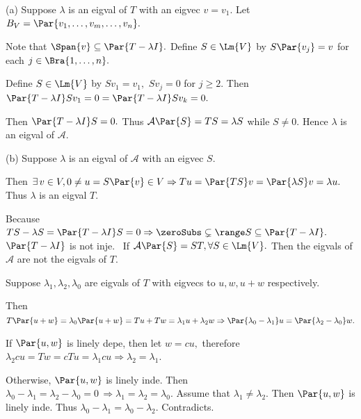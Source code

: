 \par\quad
(a) Suppose $\lambda$ is an eigval of $T$ with an eigvec $v=v_1.$ Let $B_V=\Par{v_1,\dots,v_m,\dots,v_n}.$\par\quad\Ha
Note that $\Span{v}\subseteq\null\Par{T-\lambda I}.$ Define $S\in\Lm{V}$ by $S\Par{v_j}=v$ for each $j\in\Bra{1,\dots,n}.$\par\quad\Ha
\Or Define $S\in\Lm{V}$ by $Sv_1=v_1,\,\,Sv_j=0$ for $j\geqslant 2.$ Then $\Par{T-\lambda I}Sv_1=0=\Par{T-\lambda I}Sv_k=0.$\par\quad\Ha
Then $\Par{T-\lambda I}S=0.$ Thus $\mathcal{A}\Par{S}=TS=\lambda S$ while $S\neq 0.$ Hence $\lambda$ is an eigval of $\mathcal{A}.$\vspace{4pt}\par\quad
(b) Suppose $\lambda$ is an eigval of $\mathcal{A}$ with an eigvec $S.$\par\quad\Hb
Then $\exists\,v\in V,0\neq u=S\Par{v}\in V\Rightarrow Tu=\Par{TS} v=\Par{\lambda S} v=\lambda u.$ Thus $\lambda$ is an eigval $T.$\par\quad\Hb
\Or Because $TS-\lambda S=\Par{T-\lambda I}S=0\Rightarrow\zeroSubs\subsetneq\range S\subseteq\null\Par{T-\lambda I}.$ $\Par{T-\lambda I}$ is not inje.\PfEnd\vspace{4pt}
\Comment \,\,\,{If $\mathcal{A}\Par{S}=ST,\forall S\in\Lm{V}.$ Then the eigvals of $\mathcal{A}$ are not the eigvals of $T.$}
\SepLine

Suppose $\lambda_1,\lambda_2,\lambda_0$ are eigvals of $T$ with eigvecs to $u,w,u+w$ respectively.\par
\Blind{\Solution} Then $T\Par{u+w}=\lambda_0\Par{u+w}=Tu+Tw=\lambda_1 u+\lambda_2 w\Rightarrow \Par{\lambda_0-\lambda_1}u=\Par{\lambda_2-\lambda_0}w.$\par
\Blind{\Solution} If $\Par{u,w}$ is linely depe, then let $w=cu,$ therefore $\lambda_2 cu=Tw=cTu=\lambda_1 cu\Rightarrow\lambda_2=\lambda_1.$\par
\Blind{\Solution} Otherwise, $\Par{u,w}$ is linely inde. Then $\lambda_0-\lambda_1=\lambda_2-\lambda_0=0\,\Rightarrow\lambda_1=\lambda_2=\lambda_0.$\PfEnd
\Blind{\Solution} \Or Assume that $\lambda_1\neq \lambda_2.$ Then $\Par{u,w}$ is linely inde. Thus $\lambda_0-\lambda_1=\lambda_0-\lambda_2.$ Contradicts.\PfEnd
\SepLine

